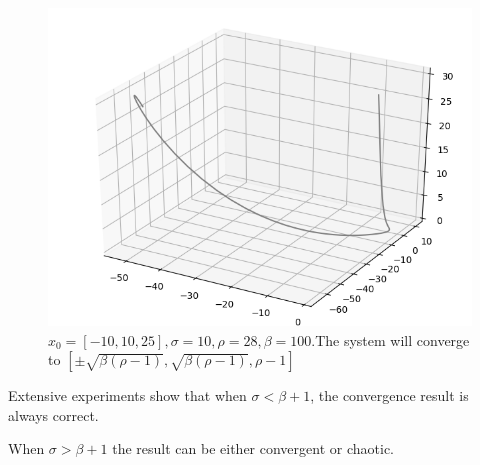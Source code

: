 \documentclass{article}
\begin{document}
\begin{figure}[H]
	\centering
	\caption{$x_0 = [-10,10,25], \sigma = 10, \rho = 28, \beta = 100$.The system will converge to $[\pm\sqrt{\beta(\rho-1)},\sqrt{\beta(\rho-1)},\rho-1]$}
	\includegraphics[scale=0.5]{../7.png}
\end{figure}
Extensive experiments show that when $\sigma < \beta +1$, the convergence result is always correct.

When $\sigma>\beta+1$ the result can be either convergent or chaotic.
\end{document}
